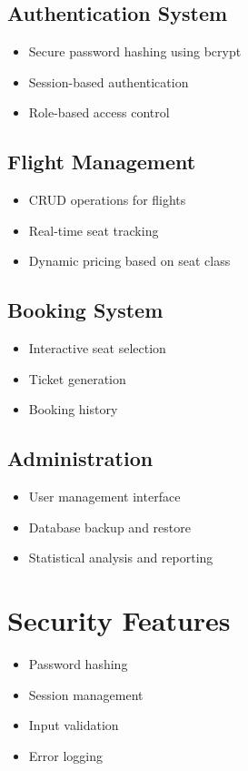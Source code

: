 \documentclass{article}
\begin{document}
\subsection{Authentication System}
\begin{itemize}
    \item Secure password hashing using bcrypt
    \item Session-based authentication
    \item Role-based access control
\end{itemize}

\subsection{Flight Management}
\begin{itemize}
    \item CRUD operations for flights
    \item Real-time seat tracking
    \item Dynamic pricing based on seat class
\end{itemize}

\subsection{Booking System}
\begin{itemize}
    \item Interactive seat selection
    \item Ticket generation
    \item Booking history
\end{itemize}

\subsection{Administration}
\begin{itemize}
    \item User management interface
    \item Database backup and restore
    \item Statistical analysis and reporting
\end{itemize}

\section{Security Features}
\begin{itemize}
    \item Password hashing
    \item Session management
    \item Input validation
    \item Error logging
\end{itemize}
\end{document}
